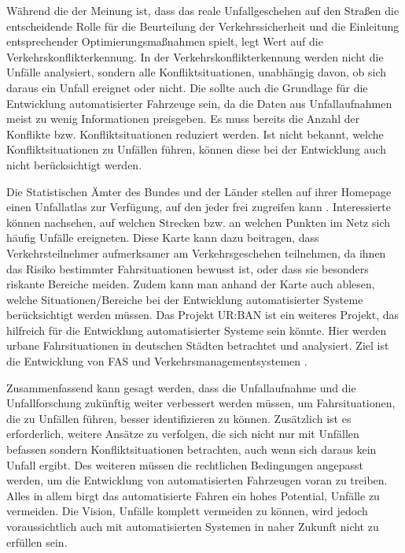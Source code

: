 Während die \Textcite[S. 12]{DEKRA.2017} der Meinung ist, dass das reale Unfallgeschehen auf den Straßen die entscheidende Rolle für die Beurteilung der Verkehrssicherheit und die Einleitung entsprechender Optimierungsmaßnahmen spielt, legt \Textcite[S. 10]{Erke.1978} Wert auf die Verkehrskonflikterkennung. In der Verkehrskonflikterkennung werden nicht die Unfälle analysiert, sondern alle Konfliktsituationen, unabhängig davon, ob sich daraus ein Unfall ereignet oder nicht. Die sollte auch die Grundlage für die Entwicklung automatisierter Fahrzeuge sein, da die Daten aus Unfallaufnahmen meist zu wenig Informationen preisgeben. Es muss bereits die Anzahl der Konflikte bzw. Konfliktsituationen reduziert werden. Ist nicht bekannt, welche Konfliktsituationen zu Unfällen führen, können diese bei der Entwicklung auch nicht berücksichtigt werden.

Die Statistischen Ämter des Bundes und der Länder stellen auf ihrer Homepage einen Unfallatlas zur Verfügung, auf den jeder frei zugreifen kann \parencite{StatistischeAmterdesBundesundderLander.2018}. Interessierte können nachsehen, auf welchen Strecken bzw. an welchen Punkten im Netz sich häufig Unfälle ereigneten. Diese Karte kann dazu beitragen, dass Verkehrsteilnehmer aufmerksamer am Verkehrsgeschehen teilnehmen, da ihnen das Risiko bestimmter Fahrsituationen bewusst ist, oder dass sie besonders riskante Bereiche meiden. Zudem kann man anhand der Karte auch ablesen, welche Situationen/Bereiche bei der Entwicklung automatisierter Systeme berücksichtigt werden müssen. Das Projekt UR:BAN ist ein weiteres Projekt, das hilfreich für die Entwicklung automatisierter Systeme sein könnte. Hier werden urbane Fahrsituationen in deutschen Städten betrachtet und analysiert. Ziel ist die Entwicklung von \ac{FAS} und Verkehrsmanagementsystemen \parencite{UR:BANBuro.2018}.

Zusammenfassend kann gesagt werden, dass die Unfallaufnahme und die Unfallforschung zukünftig weiter verbessert werden müssen, um Fahrsituationen, die zu Unfällen führen, besser identifizieren zu können. Zusätzlich ist es erforderlich, weitere Ansätze zu verfolgen, die sich nicht nur mit Unfällen befassen sondern Konfliktsituationen betrachten, auch wenn sich daraus kein Unfall ergibt. Des weiteren müssen die rechtlichen Bedingungen angepasst werden, um die Entwicklung von automatisierten Fahrzeugen voran zu treiben. Alles in allem birgt das automatisierte Fahren ein hohes Potential, Unfälle zu vermeiden. Die Vision, Unfälle komplett vermeiden zu können, wird jedoch voraussichtlich auch mit automatisierten Systemen in naher Zukunft nicht zu erfüllen sein.
